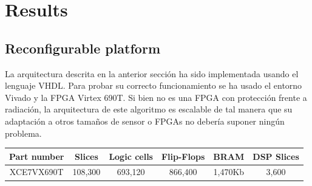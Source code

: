 \cleardoublepage
\chapter{Results}
\label{makereference}
\section{Reconfigurable platform}
La arquitectura descrita en la anterior sección ha sido implementada usando el lenguaje VHDL. Para probar su correcto funcionamiento se ha usado el entorno Vivado y la FPGA Virtex 690T. Si bien no es una FPGA con protección frente a radiación, la arquitectura de este algoritmo es escalable de tal manera que su adaptación a otros tamaños de sensor o FPGAs no debería suponer ningún problema.

\begin{center}
 \begin{tabular}{|c|c|c|c|c|c|} 
 \hline
 Part number & Slices & Logic cells & Flip-Flops & BRAM & DSP Slices \\
 \hline
 XCE7VX690T & 108,300 & 693,120 & 866,400 & 1,470Kb & 3,600\\
 \hline
\end{tabular}
\end{center}


